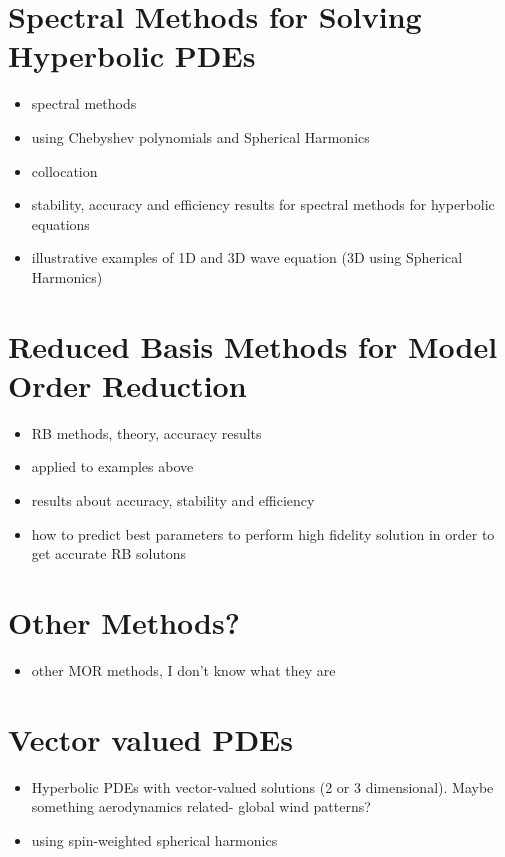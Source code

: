 \chapter{Spectral Methods for Solving Hyperbolic PDEs}
\begin{itemize}
\item spectral methods
\item using Chebyshev polynomials and Spherical Harmonics
\item collocation
\item stability, accuracy and efficiency results for spectral methods for hyperbolic equations
\item illustrative examples of 1D and 3D wave equation (3D using Spherical Harmonics)
\end{itemize}

\chapter{Reduced Basis Methods for Model Order Reduction}
\begin{itemize}
\item RB methods, theory, accuracy results
\item applied to examples above
\item results about accuracy, stability and efficiency
\item how to predict best parameters to perform high fidelity solution in order to get accurate RB solutons
\end{itemize}

\chapter{Other Methods?}
\begin{itemize}
\item other MOR methods, I don't know what they are
\end{itemize}

\chapter{Vector valued PDEs}
\begin{itemize}
\item Hyperbolic PDEs with vector-valued solutions (2 or 3 dimensional). Maybe something aerodynamics related- global wind patterns?
\item using spin-weighted spherical harmonics
\end{itemize}

